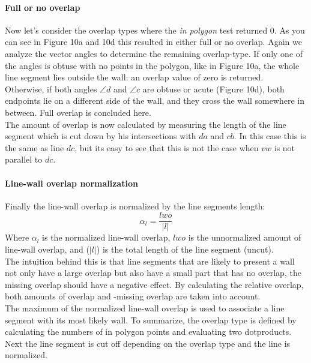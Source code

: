 	\paragraph{Full or no overlap}
	Now let's consider the overlap types where the \emph{in polygon} test
	returned 0.
	As you can see in Figure 10a and 10d this resulted in either full or no overlap.
	Again we analyze the vector angles to determine the remaining overlap-type.
	If only one of the angles is obtuse with no points in the polygon, like in Figure 10a,
	the whole line segment lies outside the wall: an overlap value of zero
	is returned.\\
	Otherwise, if both angles $\angle d$ and $\angle c$ are obtuse or acute (Figure 10d),
	both endpoints lie on a different side of the wall, and they cross the wall somewhere in
	between. Full overlap is concluded here. \\
	The amount of overlap is now calculated by measuring the length
	of the line segment which is cut down by his intersections with $da$ and
	$cb$. In this case this is the same as line $dc$, but its easy to see that
	this is not the case when $vw$ is not parallel to $dc$.\\
	
	\paragraph{Line-wall overlap normalization}
	Finally the line-wall overlap is normalized by the line segments length:\\
	\begin{equation}
		\alpha_l = \frac{lwo}{|l|}
	\end{equation}
	Where $\alpha_l$ is the normalized line-wall overlap, $lwo$ is the unnormalized
	amount of line-wall overlap, and ($|l|$) is the total length of the line
	segment (uncut).\\
	The intuition behind this is that line segments that are likely to
	present a wall not only have a large overlap but also have a small part
	that has no overlap, the missing overlap should have a negative effect. By
	calculating the relative overlap, both amounts of overlap and -missing
	overlap are taken into account.\\
	The maximum of the normalized line-wall overlap is used to associate a
	line segment with its most likely wall.
	To summarize, the overlap type is defined by calculating the numbers of in
	polygon points and evaluating two dotproducts. Next the line segment is cut off
	depending on the overlap type and the line is normalized. \\
	
